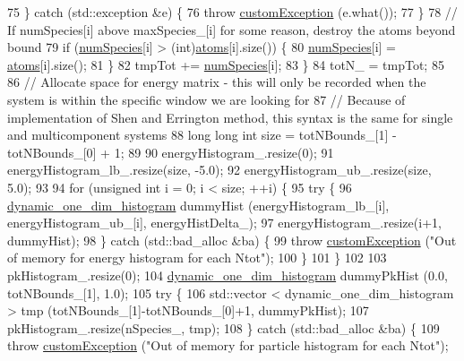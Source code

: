 \begin{DoxyCode}
75         \} \textcolor{keywordflow}{catch} (std::exception &e) \{
76             \textcolor{keywordflow}{throw} \hyperlink{classcustom_exception}{customException} (e.what());
77         \}
78         \textcolor{comment}{// If numSpecies[i] above maxSpecies\_[i] for some reason, destroy the atoms beyond bound}
79         \textcolor{keywordflow}{if} (\hyperlink{classsim_system_a9eea865e6dc1cff377b1e79c4d9c23f0}{numSpecies}[i] > (\textcolor{keywordtype}{int})\hyperlink{classsim_system_a90421b19082f7fb8fc23b7264b1161e4}{atoms}[i].size()) \{
80             \hyperlink{classsim_system_a9eea865e6dc1cff377b1e79c4d9c23f0}{numSpecies}[i] = \hyperlink{classsim_system_a90421b19082f7fb8fc23b7264b1161e4}{atoms}[i].size();
81         \}
82         tmpTot += \hyperlink{classsim_system_a9eea865e6dc1cff377b1e79c4d9c23f0}{numSpecies}[i];
83     \}
84     totN\_ = tmpTot;
85 
86     \textcolor{comment}{// Allocate space for energy matrix - this will only be recorded when the system is within the specific
       window we are looking for}
87     \textcolor{comment}{// Because of implementation of Shen and Errington method, this syntax is the same for single and
       multicomponent systems}
88     \textcolor{keywordtype}{long} \textcolor{keywordtype}{long} \textcolor{keywordtype}{int} size = totNBounds\_[1] - totNBounds\_[0] + 1;
89 
90     energyHistogram\_.resize(0);
91     energyHistogram\_lb\_.resize(size, -5.0);
92     energyHistogram\_ub\_.resize(size, 5.0);
93 
94     \textcolor{keywordflow}{for} (\textcolor{keywordtype}{unsigned} \textcolor{keywordtype}{int} i = 0; i < size; ++i) \{
95         \textcolor{keywordflow}{try} \{
96             \hyperlink{classdynamic__one__dim__histogram}{dynamic\_one\_dim\_histogram} dummyHist (energyHistogram\_lb\_[i], 
      energyHistogram\_ub\_[i], energyHistDelta\_);
97             energyHistogram\_.resize(i+1, dummyHist);
98         \} \textcolor{keywordflow}{catch} (std::bad\_alloc &ba) \{
99             \textcolor{keywordflow}{throw} \hyperlink{classcustom_exception}{customException} (\textcolor{stringliteral}{"Out of memory for energy histogram for each Ntot"});
100         \}
101     \}
102 
103     pkHistogram\_.resize(0);
104     \hyperlink{classdynamic__one__dim__histogram}{dynamic\_one\_dim\_histogram} dummyPkHist (0.0, totNBounds\_[1], 1.0);
105     \textcolor{keywordflow}{try} \{
106         std::vector < dynamic\_one\_dim\_histogram > tmp (totNBounds\_[1]-totNBounds\_[0]+1, dummyPkHist);
107         pkHistogram\_.resize(nSpecies\_, tmp);
108     \} \textcolor{keywordflow}{catch} (std::bad\_alloc &ba) \{
109         \textcolor{keywordflow}{throw} \hyperlink{classcustom_exception}{customException} (\textcolor{stringliteral}{"Out of memory for particle histogram for each Ntot"});

\end{DoxyCode}
